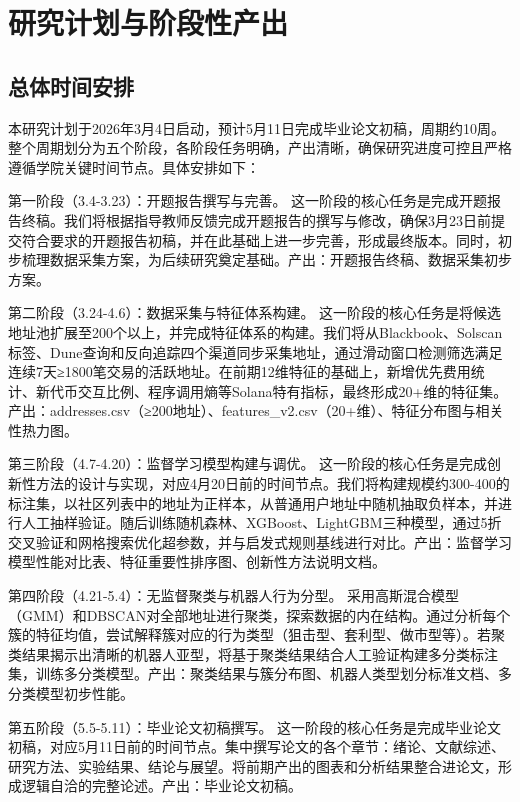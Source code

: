 \section{研究计划与阶段性产出}

\subsection{总体时间安排}


\par 本研究计划于2026年3月4日启动，预计5月11日完成毕业论文初稿，周期约10周。整个周期划分为五个阶段，各阶段任务明确，产出清晰，确保研究进度可控且严格遵循学院关键时间节点。具体安排如下：
\par 第一阶段（3.4-3.23）：开题报告撰写与完善。 这一阶段的核心任务是完成开题报告终稿。我们将根据指导教师反馈完成开题报告的撰写与修改，确保3月23日前提交符合要求的开题报告初稿，并在此基础上进一步完善，形成最终版本。同时，初步梳理数据采集方案，为后续研究奠定基础。产出：开题报告终稿、数据采集初步方案。
\par 第二阶段（3.24-4.6）：数据采集与特征体系构建。 这一阶段的核心任务是将候选地址池扩展至200个以上，并完成特征体系的构建。我们将从Blackbook、Solscan标签、Dune查询和反向追踪四个渠道同步采集地址，通过滑动窗口检测筛选满足连续7天≥1800笔交易的活跃地址。在前期12维特征的基础上，新增优先费用统计、新代币交互比例、程序调用熵等Solana特有指标，最终形成20+维的特征集。产出：addresses.csv（≥200地址）、features\_v2.csv（20+维）、特征分布图与相关性热力图。
\par 第三阶段（4.7-4.20）：监督学习模型构建与调优。 这一阶段的核心任务是完成创新性方法的设计与实现，对应4月20日前的时间节点。我们将构建规模约300-400的标注集，以社区列表中的地址为正样本，从普通用户地址中随机抽取负样本，并进行人工抽样验证。随后训练随机森林、XGBoost、LightGBM三种模型，通过5折交叉验证和网格搜索优化超参数，并与启发式规则基线进行对比。产出：监督学习模型性能对比表、特征重要性排序图、创新性方法说明文档。
\par 第四阶段（4.21-5.4）：无监督聚类与机器人行为分型。 采用高斯混合模型（GMM）和DBSCAN对全部地址进行聚类，探索数据的内在结构。通过分析每个簇的特征均值，尝试解释簇对应的行为类型（狙击型、套利型、做市型等）。若聚类结果揭示出清晰的机器人亚型，将基于聚类结果结合人工验证构建多分类标注集，训练多分类模型。产出：聚类结果与簇分布图、机器人类型划分标准文档、多分类模型初步性能。
\par 第五阶段（5.5-5.11）：毕业论文初稿撰写。 这一阶段的核心任务是完成毕业论文初稿，对应5月11日前的时间节点。集中撰写论文的各个章节：绪论、文献综述、研究方法、实验结果、结论与展望。将前期产出的图表和分析结果整合进论文，形成逻辑自洽的完整论述。产出：毕业论文初稿。

